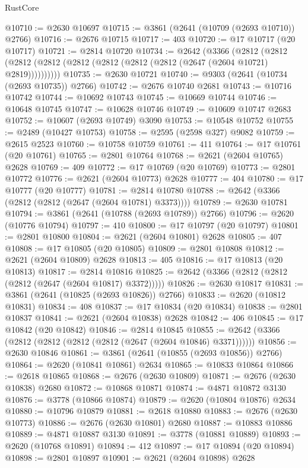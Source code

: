 \begin{lexlean}{RustCore}
\begin{coremodule}
@10710 := @2630 @10697
@10715 := @3861 (@2641 (@10709 (@2693 @10710)) @2766)
@10716 := @2676 @10715
@10717 := 403
@10720 := @17 @10717 (@20 @10717)
@10721 := @2814 @10720
@10734 := @2642
    (@3366
      (@2812 (@2812 (@2812 (@2812 (@2812 (@2812 (@2812 (@2812 (@2647 (@2604 @10721) @2819))))))))))
@10735 := @2630 @10721
@10740 := @9303 (@2641 (@10734 (@2693 @10735)) @2766)
@10742 := @2676 @10740 @2681
@10743 := @10716 @10742
@10744 := @10692 @10743
@10745 := @10669 @10744
@10746 := @10648 @10745
@10747 := @10628 @10746
@10749 := @10609 @10747 @2683
@10752 := @10607 (@2693 @10749) @3090
@10753 := @10548 @10752
@10755 := @2489 (@10427 @10753)
@10758 := @2595 (@2598 @327) @9082
@10759 := @2615 @2523
@10760 := @10758 @10759
@10761 := 411
@10764 := @17 @10761 (@20 @10761)
@10765 := @2801 @10764
@10768 := @2621 (@2604 @10765) @2628
@10769 := 409
@10772 := @17 @10769 (@20 @10769)
@10773 := @2801 @10772
@10776 := @2621 (@2604 @10773) @2628
@10777 := 404
@10780 := @17 @10777 (@20 @10777)
@10781 := @2814 @10780
@10788 := @2642 (@3366 (@2812 (@2812 (@2647 (@2604 @10781) @3373))))
@10789 := @2630 @10781
@10794 := @3861 (@2641 (@10788 (@2693 @10789)) @2766)
@10796 := @2620 (@10776 @10794)
@10797 := 410
@10800 := @17 @10797 (@20 @10797)
@10801 := @2801 @10800
@10804 := @2621 (@2604 @10801) @2628
@10805 := 407
@10808 := @17 @10805 (@20 @10805)
@10809 := @2801 @10808
@10812 := @2621 (@2604 @10809) @2628
@10813 := 405
@10816 := @17 @10813 (@20 @10813)
@10817 := @2814 @10816
@10825 := @2642 (@3366 (@2812 (@2812 (@2812 (@2647 (@2604 @10817) @3372)))))
@10826 := @2630 @10817
@10831 := @3861 (@2641 (@10825 (@2693 @10826)) @2766)
@10833 := @2620 (@10812 @10831)
@10834 := 408
@10837 := @17 @10834 (@20 @10834)
@10838 := @2801 @10837
@10841 := @2621 (@2604 @10838) @2628
@10842 := 406
@10845 := @17 @10842 (@20 @10842)
@10846 := @2814 @10845
@10855 := @2642 (@3366 (@2812 (@2812 (@2812 (@2812 (@2647 (@2604 @10846) @3371))))))
@10856 := @2630 @10846
@10861 := @3861 (@2641 (@10855 (@2693 @10856)) @2766)
@10864 := @2620 (@10841 @10861) @2634
@10865 := @10833 @10864
@10866 := @2618 @10865
@10868 := @2676 (@2630 @10809)
@10871 := @2676 (@2630 @10838) @2680
@10872 := @10868 @10871
@10874 := @4871 @10872 @3130
@10876 := @3778 (@10866 @10874)
@10879 := @2620 (@10804 @10876) @2634
@10880 := @10796 @10879
@10881 := @2618 @10880
@10883 := @2676 (@2630 @10773)
@10886 := @2676 (@2630 @10801) @2680
@10887 := @10883 @10886
@10889 := @4871 @10887 @3130
@10891 := @3778 (@10881 @10889)
@10893 := @2620 (@10768 @10891)
@10894 := 412
@10897 := @17 @10894 (@20 @10894)
@10898 := @2801 @10897
@10901 := @2621 (@2604 @10898) @2628

\end{coremodule}
\end{lexlean}
